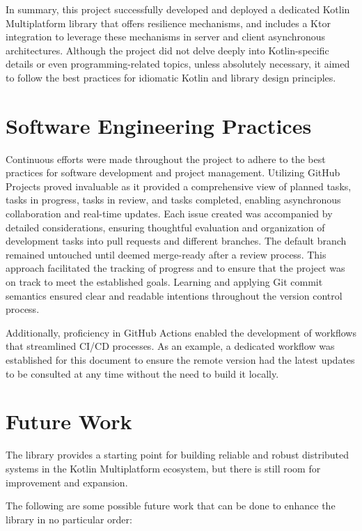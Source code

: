 In summary, this project successfully developed and deployed a dedicated Kotlin Multiplatform library that offers resilience mechanisms, and includes a Ktor integration to leverage these mechanisms in server and client asynchronous architectures.
Although the project did not delve deeply into Kotlin-specific details or even programming-related topics, unless
absolutely necessary, it aimed to follow the best practices for idiomatic Kotlin and library design principles.


\section{Software Engineering Practices}\label{sec:software-engineering-practices}

Continuous efforts were made throughout the project
to adhere to the best practices for software development and project management.
Utilizing GitHub Projects proved invaluable as it provided a comprehensive view of planned tasks,
tasks in progress, tasks in review, and tasks completed, enabling asynchronous collaboration and real-time updates.
Each issue created was accompanied by detailed considerations,
ensuring thoughtful evaluation and organization of development tasks into pull requests and different branches.
The default branch remained untouched until deemed merge-ready after a review process.
This approach facilitated the tracking of progress
and to ensure that the project was on track to meet the established goals.
Learning and applying Git commit semantics ensured clear and readable intentions throughout the version control process.

Additionally, proficiency in GitHub Actions enabled the development of workflows that streamlined CI/CD processes.
As an example,
a dedicated workflow was established for this document
to ensure the remote version had the latest updates to be consulted at any time without the need to build it locally.


\section{Future Work}\label{sec:future-work}

The library provides a starting point for building reliable and robust distributed systems in the Kotlin Multiplatform ecosystem, but there is still room for improvement and expansion.

The following are some possible future work that can be done to enhance the library in no particular order:


